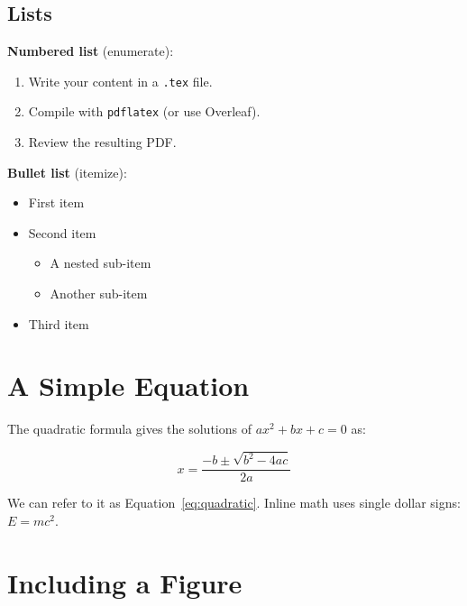 \documentclass[12pt, a4paper]{article}
\begin{document}
\subsection{Lists}

\textbf{Numbered list} (enumerate):
\begin{enumerate}
    \item Write your content in a \texttt{.tex} file.
    \item Compile with \texttt{pdflatex} (or use Overleaf).
    \item Review the resulting PDF.
\end{enumerate}

\textbf{Bullet list} (itemize):
\begin{itemize}
    \item First item
    \item Second item
        \begin{itemize}
            \item A nested sub-item
            \item Another sub-item
        \end{itemize}
    \item Third item
\end{itemize}

\section{A Simple Equation}
\label{sec:equations}

The quadratic formula gives the solutions of $ax^2 + bx + c = 0$ as:

\begin{equation}
    x = \frac{-b \pm \sqrt{b^2 - 4ac}}{2a}
    \label{eq:quadratic}
\end{equation}

We can refer to it as Equation~\eqref{eq:quadratic}.
Inline math uses single dollar signs: $E = mc^{2}$.

\section{Including a Figure}
\label{sec:figures}
\end{document}
